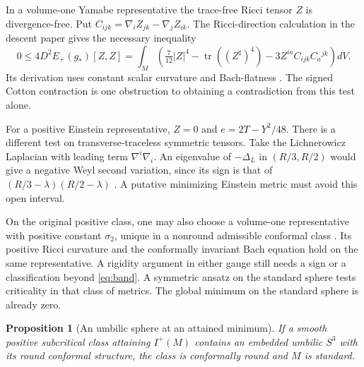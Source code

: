 \documentclass[11pt,letterpaper]{article}
\numberwithin{equation}{section}
\newtheorem{proposition}[theorem]{Proposition}
\begin{document}
In a volume-one Yamabe representative the trace-free Ricci tensor \(Z\)
is divergence-free. Put \(C_{ijk}=\nabla_i Z_{jk}-\nabla_j Z_{ik}\).
The Ricci-direction calculation in the descent paper gives the necessary
inequality
\[
 0\le 4D^2E_+(g_*)[Z,Z]
   =\int_M\left(\tfrac7{12}|Z|^4-\operatorname{tr}((Z^\sharp)^4)
                     -3Z^{ia}C_{ijk}C_a{}^{jk}\right)dV .
\]
Its derivation uses constant scalar curvature and Bach-flatness
\cite[The reduced Ricci-flow test]{Baker2026FixedDescent}.
The signed Cotton contraction is one obstruction to obtaining a
contradiction from this test alone.

For a positive Einstein representative, \(Z=0\) and
\(e=2T-Y^2/48\). There is a different test on transverse-traceless
symmetric tensors. Take the Lichnerowicz Laplacian with leading term
\(\nabla^i\nabla_i\). An eigenvalue of \(-\Delta_L\) in \((R/3,R/2)\)
would give a negative Weyl second variation, since its sign is that of
\((R/3-\lambda)(R/2-\lambda)\)
\cite[Theorem 3.10, \(n=4,\ \tau=-1/3\)]{GurskyViaclovsky2015}.
A putative minimizing Einstein metric must avoid this open interval.

On the original positive class, one may also choose a volume-one representative with positive
constant \(\sigma_2\), unique in a nonround admissible conformal class
\cite[Theorem 1.2]{ChangGurskyYang2003}\cite[Theorem 1.5]{GurskyStreets2018TwoYamabe}.
Its positive Ricci curvature and the conformally invariant Bach
equation hold on the same representative. A rigidity argument in
either gauge still needs a sign or a classification beyond
\eqref{eq:band}. A symmetric ansatz on the standard sphere tests
criticality in that class of metrics. The global minimum on the
standard sphere is already zero.



\begin{proposition}[An umbilic sphere at an attained minimum]
\label{prop:trace-cap}
If a smooth positive subcritical class attaining \(I^+(M)\) contains
an embedded umbilic \(S^3\) with its round conformal structure, the
class is conformally round and \(M\) is standard.
\end{proposition}
\end{document}
